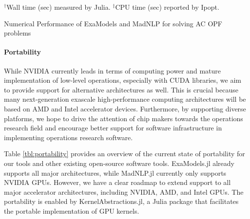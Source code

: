  
\begin{table}[t]
  \begin{center}
    
    \vspace{-1em}
    \footnotesize
    $^\dag$Wall time (sec) measured by Julia. $^\ddag$CPU time (sec) reported by Ipopt.  \caption{Numerical Performance of ExaModels and MadNLP for solving AC OPF problems}
  \end{center}
  \label{tab:num}
\end{table}

\paragraph{Portability}


While NVIDIA currently leads in terms of computing power and mature
implementation of low-level operations, especially with CUDA
libraries, we aim to provide support for alternative architectures as
well. This is crucial because many next-generation exascale
high-performance computing architectures will be based on AMD and
Intel accelerator devices. Furthermore, by supporting diverse
platforms, we hope to drive the attention of chip makers towards the
operations research field and encourage better support for software
infrastructure in implementing operations research software.

Table \ref{tbl:portability} provides an overview of the current state
of portability for our tools and other existing open-source software
tools. ExaModels.jl already supports all major architectures, while
MadNLP.jl currently only supports NVIDIA GPUs. However, we have a
clear roadmap to extend support to all major accelerator
architectures, including NVIDIA, AMD, and Intel GPUs. The portability
is enabled by KernelAbstractions.jl, a Julia package that facilitates
the portable implementation of GPU kernels. 

\begin{table}[t]
  \begin{center}
  \end{center}
  \caption{The current status on the portability of the NLP frameworks.}
  \label{tbl:portabiltiy}
\end{table}

